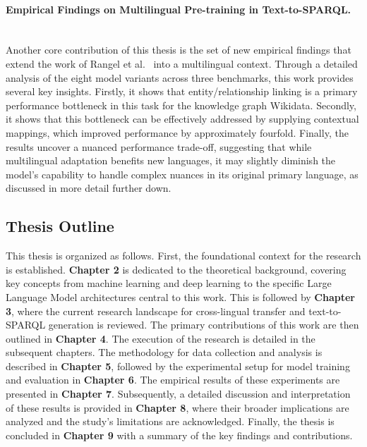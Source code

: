 \paragraph{\textbf{Empirical Findings on Multilingual Pre-training in Text-to-SPARQL.}} \mbox{}\\
Another core contribution of this thesis is the set of new empirical findings that extend the work of Rangel et al.~\cite{rangel2024sparqlgenerationanalysisfinetuning} into a multilingual context. 
Through a detailed analysis of the eight model variants across three benchmarks, this work provides several key insights. 
Firstly, it shows that entity/relationship linking is a primary performance bottleneck in this task for the knowledge graph Wikidata. 
Secondly, it shows that this bottleneck can be effectively addressed by supplying contextual mappings, which improved performance by approximately fourfold. 
Finally, the results uncover a nuanced performance trade-off, suggesting that while multilingual adaptation benefits new languages, it may slightly diminish the model's capability to handle complex nuances in its original primary language, as discussed in more detail further down.

\subsection{Thesis Outline}
This thesis is organized as follows. First, the foundational context for the research is established. \textbf{Chapter 2} is dedicated to the theoretical background, covering key concepts from machine learning and deep learning to the specific Large Language Model architectures central to this work. 
This is followed by \textbf{Chapter 3}, where the current research landscape for cross-lingual transfer and text-to-SPARQL generation is reviewed. 
The primary contributions of this work are then outlined in \textbf{Chapter 4}.
The execution of the research is detailed in the subsequent chapters. 
The methodology for data collection and analysis is described in \textbf{Chapter 5}, followed by the experimental setup for model training and evaluation in \textbf{Chapter 6}. 
The empirical results of these experiments are presented in \textbf{Chapter 7}. 
Subsequently, a detailed discussion and interpretation of these results is provided in \textbf{Chapter 8}, where their broader implications are analyzed and the study's limitations are acknowledged. 
Finally, the thesis is concluded in \textbf{Chapter 9} with a summary of the key findings and contributions.